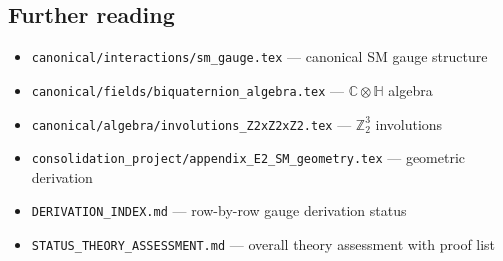 \subsection{Further reading}

\begin{itemize}
  \item \texttt{canonical/interactions/sm\_gauge.tex} — canonical SM gauge structure
  \item \texttt{canonical/fields/biquaternion\_algebra.tex} — $\mathbb{C}\otimes\mathbb{H}$ algebra
  \item \texttt{canonical/algebra/involutions\_Z2xZ2xZ2.tex} — $\mathbb{Z}_2^3$ involutions
  \item \texttt{consolidation\_project/appendix\_E2\_SM\_geometry.tex} — geometric derivation
  \item \texttt{DERIVATION\_INDEX.md} — row-by-row gauge derivation status
  \item \texttt{STATUS\_THEORY\_ASSESSMENT.md} — overall theory assessment with proof list
\end{itemize}

